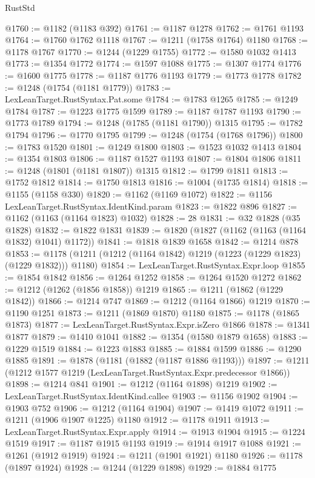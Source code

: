 \begin{lexlean}{RustStd}
\begin{coremodule}
@1760 := @1182 (@1183 @392)
@1761 := @1187 @1278
@1762 := @1761 @1193
@1764 := @1760 @1762 @1118
@1767 := @1211 (@1758 @1764) @1180
@1768 := @1178 @1767
@1770 := @1244 (@1229 @1755)
@1772 := @1580 @1032 @1413
@1773 := @1354 @1772
@1774 := @1597 @1088
@1775 := @1307 @1774
@1776 := @1600 @1775
@1778 := @1187 @1776 @1193
@1779 := @1773 @1778
@1782 := @1248 (@1754 (@1181 @1779))
@1783 := LexLeanTarget.RustSyntax.Pat.some
@1784 := @1783 @1265
@1785 := @1249 @1784
@1787 := @1223 @1775 @1599
@1789 := @1187 @1787 @1193
@1790 := @1773 @1789
@1794 := @1248 (@1785 (@1181 @1790)) @1315
@1795 := @1782 @1794
@1796 := @1770 @1795
@1799 := @1248 (@1754 (@1768 @1796))
@1800 := @1783 @1520
@1801 := @1249 @1800
@1803 := @1523 @1032 @1413
@1804 := @1354 @1803
@1806 := @1187 @1527 @1193
@1807 := @1804 @1806
@1811 := @1248 (@1801 (@1181 @1807)) @1315
@1812 := @1799 @1811
@1813 := @1752 @1812
@1814 := @1750 @1813
@1816 := @1004 (@1735 @1814)
@1818 := @1155 (@1158 @330)
@1820 := @1162 (@1169 @1072)
@1822 := @1156 LexLeanTarget.RustSyntax.IdentKind.param
@1823 := @1822 @896
@1827 := @1162 (@1163 (@1164 @1823) @1032)
@1828 := 28
@1831 := @32 @1828 (@35 @1828)
@1832 := @1822 @1831
@1839 := @1820 (@1827 (@1162 (@1163 (@1164 @1832) @1041) @1172))
@1841 := @1818 @1839 @1658
@1842 := @1214 @878
@1853 := @1178 (@1211 (@1212 (@1164 @1842) @1219 (@1223 (@1229 @1823) (@1229 @1832))) @1180)
@1854 := LexLeanTarget.RustSyntax.Expr.loop
@1855 := @1854 @1842
@1856 := @1264 @1252
@1858 := @1264 @1520 @1272
@1862 := @1212 (@1262 (@1856 @1858)) @1219
@1865 := @1211 (@1862 (@1229 @1842))
@1866 := @1214 @747
@1869 := @1212 (@1164 @1866) @1219
@1870 := @1190 @1251
@1873 := @1211 (@1869 @1870) @1180
@1875 := @1178 (@1865 @1873)
@1877 := LexLeanTarget.RustSyntax.Expr.isZero @1866
@1878 := @1341 @1877
@1879 := @1410 @1041
@1882 := @1354 (@1580 @1879 @1658)
@1883 := @1229 @1519
@1884 := @1223 @1883
@1885 := @1884 @1599
@1886 := @1290 @1885
@1891 := @1878 (@1181 (@1882 (@1187 @1886 @1193)))
@1897 := @1211 (@1212 @1577 @1219 (LexLeanTarget.RustSyntax.Expr.predecessor @1866))
@1898 := @1214 @841
@1901 := @1212 (@1164 @1898) @1219
@1902 := LexLeanTarget.RustSyntax.IdentKind.callee
@1903 := @1156 @1902
@1904 := @1903 @752
@1906 := @1212 (@1164 @1904)
@1907 := @1419 @1072
@1911 := @1211 (@1906 @1907 @1225) @1180
@1912 := @1178 @1911
@1913 := LexLeanTarget.RustSyntax.Expr.apply
@1914 := @1913 @1904
@1915 := @1224 @1519
@1917 := @1187 @1915 @1193
@1919 := @1914 @1917 @1088
@1921 := @1261 (@1912 @1919)
@1924 := @1211 (@1901 @1921) @1180
@1926 := @1178 (@1897 @1924)
@1928 := @1244 (@1229 @1898)
@1929 := @1884 @1775

\end{coremodule}
\end{lexlean}
